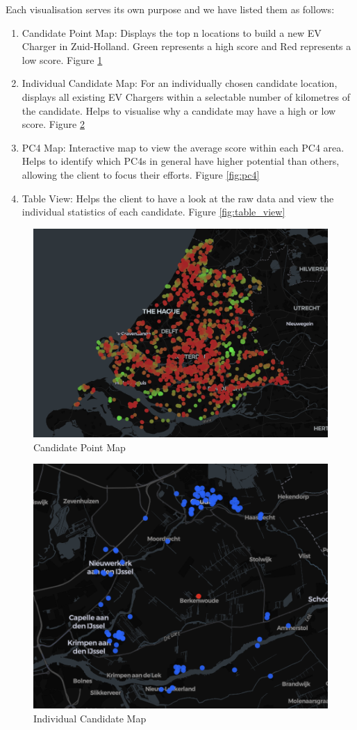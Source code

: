 \documentclass{article}
\begin{document}
Each visualisation serves its own purpose and we have listed them as follows:
\begin{enumerate}
	\item Candidate Point Map: Displays the top n locations to build a new EV Charger in Zuid-Holland. Green represents a high score and Red represents a low score. Figure \ref{fig:point_map}
	\item Individual Candidate Map: For an individually chosen candidate location, displays all existing EV Chargers within a selectable number of kilometres of the candidate. Helps to visualise why a candidate may have a high or low score. Figure \ref{fig:point_map_ev_charger}
	\item PC4 Map: Interactive map to view the average score within each PC4 area. Helps to identify which PC4s in general have higher potential than others, allowing the client to focus their efforts. Figure \ref{fig:pc4}
	\item Table View: Helps the client to have a look at the raw data and view the individual statistics of each candidate. Figure \ref{fig:table_view}
\end{enumerate}

\begin{figure}[H]
	\centering
	\includegraphics[width=0.75\linewidth]{point_map_view.png}
	\caption{Candidate Point Map}
	\label{fig:point_map}
\end{figure}

\begin{figure}[H]
	\centering
	\includegraphics[width=0.75\linewidth]{point_map_view_ev_charger.png}
	\caption{Individual Candidate Map}
	\label{fig:point_map_ev_charger}
\end{figure}
\end{document}
